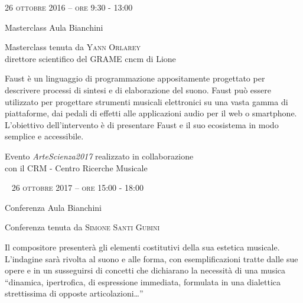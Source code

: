 
\begin{flushleft}

\large{
	\scshape{
	26 ottobre 2016 -- ore 9:30 - 13:00
	}}

\medskip
	
\small{Masterclass
	\newline Aula Bianchini}

\medskip

{\fontsize{20}{20} }

\normalfont

\normalsize

\bigskip

Masterclass tenuta da \textsc{Yann Orlarey}\\{\footnotesize direttore scientifico del GRAME cncm di Lione}


\bigskip

Faust è un linguaggio di programmazione appositamente progettato per descrivere processi di sintesi e di elaborazione del suono. Faust può essere utilizzato per progettare strumenti musicali elettronici su una vasta gamma di piattaforme, dai pedali di effetti alle applicazioni audio per il web o smartphone. L'obiettivo dell'intervento è di presentare Faust e il suo ecosistema in modo semplice e accessibile.

\bigskip

\small{Evento \textit{ArteScienza2017} realizzato in collaborazione\\con il CRM - Centro Ricerche Musicale}

\vfill


~\vfill
\large{
	\scshape{
	26 ottobre 2017 -- ore 15:00 - 18:00
	}}

\medskip
	
\small{Conferenza
	\newline Aula Bianchini}

\medskip

{\fontsize{18}{18} }

\normalfont

\normalsize

\bigskip

Conferenza tenuta da \textsc{Simone Santi Gubini}

\bigskip

Il compositore presenterà gli elementi costitutivi della sua estetica musicale. L’indagine sarà rivolta al suono e alle forma, con esemplificazioni tratte dalle sue opere e in un susseguirsi di concetti che dichiarano la necessità di una musica “dinamica, ipertrofica, di espressione immediata, formulata in una dialettica strettissima di opposte articolazioni…”

\end{flushleft}

\vfill
